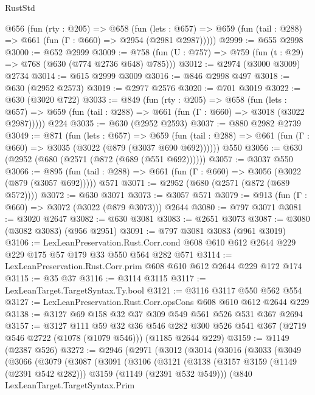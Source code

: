 \begin{lexlean}{RustStd}
\begin{coremodule}
  @656
    (fun (rty : @205) =>
    @658
      (fun (lets : @657) =>
      @659 (fun (tail : @288) => @661 (fun (Γ : @660) => @2954 (@2981 @2987)))))
@2999 := @655 @2998
@3000 := @652 @2999
@3009 := @758 (fun (U : @757) => @759 (fun (t : @29) => @768 (@630 (@774 @2736 @648) @785)))
@3012 := @2974 (@3000 @3009) @2734
@3014 := @615 @2999 @3009
@3016 := @846 @2998 @497
@3018 := @630 (@2952 @2573)
@3019 := @2977 @2576
@3020 := @701 @3019
@3022 := @630 (@3020 @722)
@3033 := @849
    (fun (rty : @205) =>
    @658
      (fun (lets : @657) =>
      @659 (fun (tail : @288) => @661 (fun (Γ : @660) => @3018 (@3022 @2987)))))
    @224
@3035 := @630 (@2952 @2593)
@3037 := @880 @2982 @2739
@3049 := @871
    (fun (lets : @657) =>
    @659 (fun (tail : @288) => @661 (fun (Γ : @660) => @3035 (@3022 (@879 (@3037 @690 @692))))))
    @550
@3056 := @630 (@2952 (@680 (@2571 (@872 (@689 (@551 @692))))))
@3057 := @3037 @550
@3066 := @895 (fun (tail : @288) => @661 (fun (Γ : @660) => @3056 (@3022 (@879 (@3057 @692))))) @571
@3071 := @2952 (@680 (@2571 (@872 (@689 @572))))
@3072 := @630 @3071
@3073 := @3057 @571
@3079 := @913 (fun (Γ : @660) => @3072 (@3022 (@879 @3073))) @2644
@3080 := @797 @3071
@3081 := @3020 @2647
@3082 := @630 @3081
@3083 := @2651 @3073
@3087 := @3080 (@3082 @3083) (@956 @2951)
@3091 := @797 @3081 @3083 (@961 @3019)
@3106 := LexLeanPreservation.Rust.Corr.cond
    @608
    @610
    @612
    @2644
    @229
    @229
    @175
    @57
    @179
    @33
    @550
    @564
    @282
    @571
@3114 := LexLeanPreservation.Rust.Corr.prim @608 @610 @612 @2644 @229 @172 @174
@3115 := @35 @37
@3116 := @3114 @3115
@3117 := LexLeanTarget.TargetSyntax.Ty.bool
@3121 := @3116 @3117 @550 @562 @554
@3127 := LexLeanPreservation.Rust.Corr.opsCons @608 @610 @612 @2644 @229
@3138 := @3127 @69 @158 @32 @37 @309 @549 @561 @526 @531 @367 @2694
@3157 := @3127
    @111
    @59
    @32
    @36
    @546
    @282
    @300
    @526
    @541
    @367
    (@2719 @546 @2722 (@1078 (@1079 @546)))
    (@1185 @2644 @229)
@3159 := @1149 (@2387 @526)
@3272 := @2946
    (@2971
      (@3012
        (@3014
          (@3016
            (@3033
              (@3049
                (@3066
                  (@3079
                    (@3087
                      (@3091
                        (@3106
                          (@3121
                            (@3138
                              (@3157 @3159 (@1149 (@2391 @542 @282)))
                              @3159
                              (@1149 (@2391 @532 @549)))
                            (@840
                              LexLeanTarget.TargetSyntax.Prim

\end{coremodule}
\end{lexlean}
